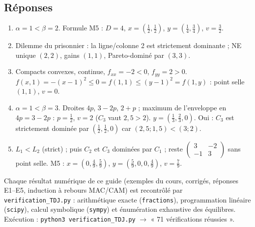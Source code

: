 \documentclass[11pt,a4paper]{article}
\begin{document}
\subsection*{Réponses}
\begin{enumerate}[label=\textbf{E\arabic*.},leftmargin=*]
\item $\alpha=1<\beta=2$. Formule M5 : $D=4$, $x=(\frac12,\frac12)$, $y=(\frac14,\frac34)$, $v=\frac32$.
\item Dilemme du prisonnier : la ligne/colonne 2 est strictement dominante ; NE unique $(2,2)$, gains $(1,1)$, Pareto-dominé par $(3,3)$.
\item Compacts convexes, continue, $f_{xx}=-2<0$, $f_{yy}=2>0$. $f(x,1)=-(x-1)^2\le0=f(1,1)\le(y-1)^2=f(1,y)$ : point selle $(1,1)$, $v=0$.
\item $\alpha=1<\beta=3$. Droites $4p$, $3-2p$, $2+p$ ; maximum de l'enveloppe en $4p=3-2p$ : $p=\frac12$, $v=2$ ($C_3$ vaut $2{,}5>2$). $y=(\frac13,\frac23,0)$. Oui : $C_3$ est strictement dominée par $(\frac12,\frac12,0)$ car $(2{,}5;1{,}5)<(3;2)$.
\item $L_1<L_2$ (strict) ; puis $C_2$ et $C_3$ dominées par $C_1$ ; reste $\begin{pmatrix}3&-2\\-1&3\end{pmatrix}$ sans point selle. M5 : $x=(0,\frac49,\frac59)$, $y=(\frac59,0,0,\frac49)$, $v=\frac79$.
\end{enumerate}

\begin{verifbox}
Chaque résultat numérique de ce guide (exemples du cours, corrigés, réponses E1--E5, induction à rebours MAC/CAM) est recontrôlé par \texttt{verification\_TDJ.py} : arithmétique exacte (\texttt{fractions}), programmation linéaire (\texttt{scipy}), calcul symbolique (\texttt{sympy}) et énumération exhaustive des équilibres. Exécution : \texttt{python3 verification\_TDJ.py} $\to$ « 71 vérifications réussies ».
\end{verifbox}
\end{document}
